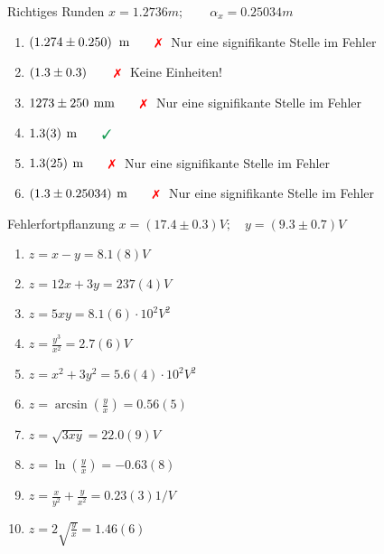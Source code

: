 \documentclass{alex_gp}
\begin{document}
\renewcommand{\labelenumi}{\alph{enumi})}


\begin{mybox}{Richtiges Runden}
	\centering \( x = 1.2736 \unit{m};\qquad \alpha_x = 0.25034 \unit{m} \)
	\tcblower
	\begin{enumerate}
		\item \( \left(1.274 \pm 0.250 \right) \unit{m} \qquad \xmark \)  Nur eine signifikante Stelle im Fehler
	\tcbline
		\item \( \left(1.3 \pm 0.3 \right) \qquad \xmark \)  Keine Einheiten!
	\tcbline
		\item \( 1273 \pm 250 \unit{mm} \qquad \xmark \)  Nur eine signifikante Stelle im Fehler
	\tcbline
		\item \( 1.3(3) \unit{m} \qquad \cmark \)
	\tcbline
		\item \( 1.3(25) \unit{m} \qquad \xmark \)  Nur eine signifikante Stelle im Fehler
	\tcbline
		\item \(  (1.3 \pm 0.25034) \unit{m} \qquad \xmark \)  Nur eine signifikante Stelle im Fehler
	\end{enumerate}
\end{mybox}

\begin{mybox}{Fehlerfortpflanzung}
	\centering \( x = (17.4 \pm 0.3) \unit{V};\quad y = (9.3 \pm 0.7) \unit{V} \)
	\tcblower
	\begin{enumerate}
		\item \( z = x - y = 8.1(8) \unit{V} \)
	\tcbline
		\item \( z = 12x + 3y = 237(4) \unit{V} \)
	\tcbline
		\item \( z = 5xy = 8.1(6) \cdot 10^{2} \unit{V^2} \)
	\tcbline
		\item \( z = \tfrac{y^3}{x^2} = 2.7(6) \unit{V} \)
	\tcbline
		\item \( z = x^2 + 3y^2 = 5.6(4) \cdot 10^{2} \unit{V^2}\)
	\tcbline
		\item \( z = \arcsin(\tfrac{y}{x}) = 0.56(5) \)
	\tcbline
		\item \( z = \sqrt{3xy} = 22.0(9) \unit{V} \)
	\tcbline
		\item \( z = \ln(\tfrac{y}{x}) = -0.63(8) \)
	\tcbline
		\item \( z = \tfrac{x}{y^2} + \tfrac{y}{x^2} = 0.23(3) \unit{1/V} \)
	\tcbline
		\item \( z = 2\sqrt{\tfrac{y}{x}} = 1.46(6) \)
	\end{enumerate}
\end{mybox}
\end{document}
